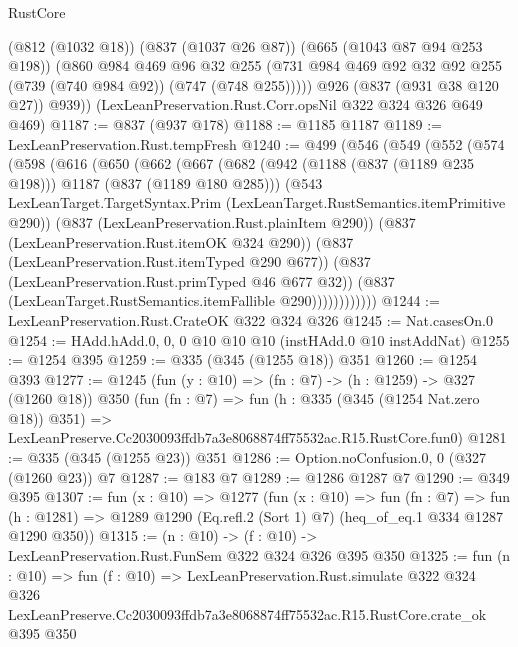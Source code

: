 \begin{lexlean}{RustCore}
\begin{coremodule}
          (@812 (@1032 @18))
          (@837 (@1037 @26 @87))
          (@665 (@1043 @87 @94 @253 @198))
          (@860
            @984
            @469
            @96
            @32
            @255
            (@731 @984 @469 @92 @32 @92 @255 (@739 (@740 @984 @92)) (@747 (@748 @255)))))
        @926
        (@837 (@931 @38 @120 @27))
        @939))
    (LexLeanPreservation.Rust.Corr.opsNil @322 @324 @326 @649 @469)
@1187 := @837 (@937 @178)
@1188 := @1185 @1187
@1189 := LexLeanPreservation.Rust.tempFresh
@1240 := @499
    (@546
      (@549
        (@552
          (@574
            (@598
              (@616
                (@650
                  (@662
                    (@667
                      (@682
                        (@942 (@1188 (@837 (@1189 @235 @198))) @1187 (@837 (@1189 @180 @285)))
                        (@543
                          LexLeanTarget.TargetSyntax.Prim
                          (LexLeanTarget.RustSemantics.itemPrimitive @290))
                        (@837 (LexLeanPreservation.Rust.plainItem @290))
                        (@837 (LexLeanPreservation.Rust.itemOK @324 @290))
                        (@837 (LexLeanPreservation.Rust.itemTyped @290 @677))
                        (@837 (LexLeanPreservation.Rust.primTyped @46 @677 @32))
                        (@837 (LexLeanTarget.RustSemantics.itemFallible @290))))))))))))
@1244 := LexLeanPreservation.Rust.CrateOK @322 @324 @326
@1245 := Nat.casesOn.{0}
@1254 := HAdd.hAdd.{0, 0, 0} @10 @10 @10 (instHAdd.{0} @10 instAddNat)
@1255 := @1254 @395
@1259 := @335 (@345 (@1255 @18)) @351
@1260 := @1254 @393
@1277 := @1245
    (fun (y : @10) => (fn : @7) -> (h : @1259) -> @327 (@1260 @18))
    @350
    (fun (fn : @7) =>
    fun (h : @335 (@345 (@1254 Nat.zero @18)) @351) =>
    LexLeanPreserve.Cc2030093ffdb7a3e8068874ff75532ac.R15.RustCore.fun0)
@1281 := @335 (@345 (@1255 @23)) @351
@1286 := Option.noConfusion.{0, 0} (@327 (@1260 @23)) @7
@1287 := @183 @7
@1289 := @1286 @1287 @7
@1290 := @349 @395
@1307 := fun (x : @10) =>
  @1277
    (fun (x : @10) =>
    fun (fn : @7) =>
    fun (h : @1281) => @1289 @1290 (Eq.refl.{2} (Sort 1) @7) (heq_of_eq.{1} @334 @1287 @1290 @350))
@1315 := (n : @10) -> (f : @10) -> LexLeanPreservation.Rust.FunSem @322 @324 @326 @395 @350
@1325 := fun (n : @10) =>
  fun (f : @10) =>
  LexLeanPreservation.Rust.simulate
    @322
    @324
    @326
    LexLeanPreserve.Cc2030093ffdb7a3e8068874ff75532ac.R15.RustCore.crate_ok
    @395
    @350
\end{coremodule}
\end{lexlean}
